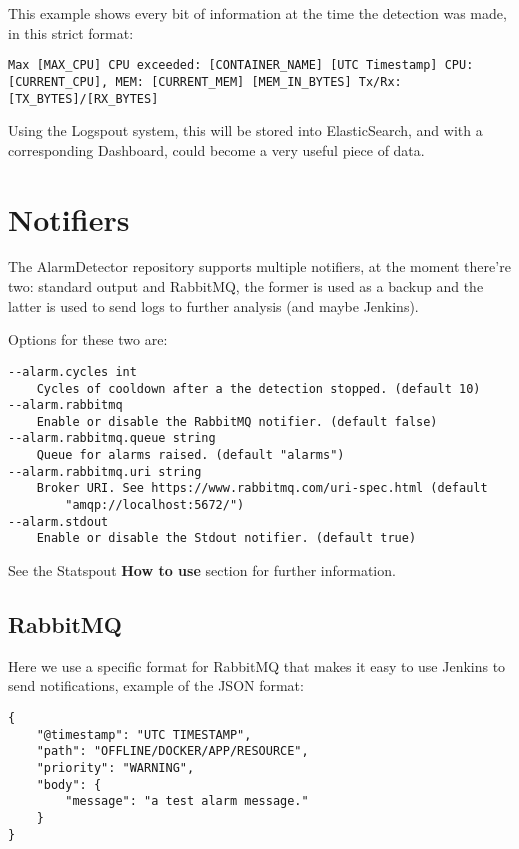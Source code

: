 This example shows every bit of information at the time the detection was made, in this strict format:

\begin{lstlisting}
Max [MAX_CPU] CPU exceeded: [CONTAINER_NAME] [UTC Timestamp] CPU: [CURRENT_CPU], MEM: [CURRENT_MEM] [MEM_IN_BYTES] Tx/Rx: [TX_BYTES]/[RX_BYTES]
\end{lstlisting}

Using the Logspout system, this will be stored into ElasticSearch, and with a corresponding Dashboard, could become a very useful piece of data.

\section{Notifiers}

The AlarmDetector repository supports multiple notifiers, at the moment there're
two: standard output and RabbitMQ, the former is used as a backup and the latter
is used to send logs to further analysis (and maybe Jenkins).

Options for these two are:

\begin{lstlisting}
--alarm.cycles int
    Cycles of cooldown after a the detection stopped. (default 10)
--alarm.rabbitmq
    Enable or disable the RabbitMQ notifier. (default false)
--alarm.rabbitmq.queue string
    Queue for alarms raised. (default "alarms")
--alarm.rabbitmq.uri string
    Broker URI. See https://www.rabbitmq.com/uri-spec.html (default
        "amqp://localhost:5672/")
--alarm.stdout
    Enable or disable the Stdout notifier. (default true)
\end{lstlisting}

See the Statspout \textbf{How to use} section for further information.

\subsection{RabbitMQ}

Here we use a specific format for RabbitMQ that makes it easy to use Jenkins to send notifications, example of the JSON format:

\begin{lstlisting}
{
    "@timestamp": "UTC TIMESTAMP",
    "path": "OFFLINE/DOCKER/APP/RESOURCE",
    "priority": "WARNING",
    "body": {
        "message": "a test alarm message."
    }
}
\end{lstlisting}

